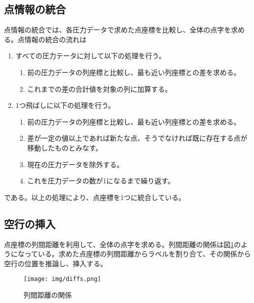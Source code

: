 \subsection{点情報の統合}
点情報の統合では、各圧力データで求めた点座標を比較し、全体の点字を求める。点情報の統合の流れは
\begin{enumerate}
	\item すべての圧力テータに対して以下の処理を行う。
		\begin{enumerate}
			\item 前の圧力データの列座標と比較し、最も近い列座標との差を求める。
			\item これまでの差の合計値を対象の列に加算する。
		\end{enumerate}
	\item 1つ飛ばしに以下の処理を行う。
		\begin{enumerate}
			\item 前の圧力データの列座標と比較し、最も近い列座標との差を求める。
			\item 差が一定の値以上であれば新たな点、そうでなければ既に存在する点が移動したものとみなす。
			\item 現在の圧力データを除外する。
			\item これを圧力データの数が1になるまで繰り返す。
		\end{enumerate}
\end{enumerate}
である。以上の処理により、点座標を1つに統合している。

\subsection{空行の挿入}
点座標の列間距離を利用して、全体の点字を求める。列間距離の関係は図\ref{f:列間距離}のようになっている。求めた点座標の列間距離からラベルを割り合て、その関係から空行の位置を推論し、挿入する。
\begin{figure}[H]
	\centering
	\texttt{[image: img/diffs.png]}
	\caption{列間距離の関係}
	\label{f:列間距離}
\end{figure}
